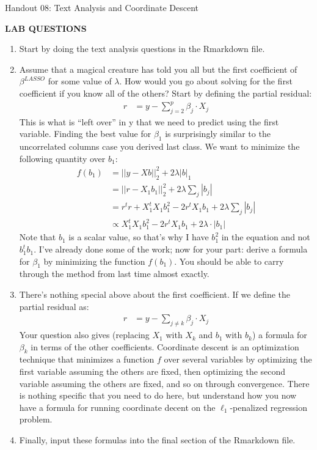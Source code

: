 \documentclass[12pt,hidelinks]{article}
\numberwithin{equation}{section}
\begin{document}
{\LARGE Handout 08: Text Analysis and Coordinate Descent}

\textbf{LAB QUESTIONS}

\vspace*{0pt}

\begin{enumerate}
\item Start by doing the text analysis questions in the Rmarkdown file.
\item Assume that a magical creature has told you all but the first
coefficient of $\beta^{LASSO}$ for some value of $\lambda$. How would you
go about solving for the first coefficient if you know all of the others?
Start by defining the partial residual:
\begin{align}
r &= y - \sum_{j = 2}^p \beta_j \cdot X_j
\end{align}
This is what is ``left over'' in y that we need to predict using the first
variable. Finding the best value for $\beta_1$ is surprisingly similar to the
uncorrelated columns case you derived last class. We want to minimize the
following quantity over $b_1$:
\begin{align}
f(b_1) &= || y - X b ||_2^2 + 2 \lambda | b |_1 \\
&= || r - X_1 b_1 ||_2^2 + 2 \lambda \sum_j | b_j | \\
&= r^t r + X_1^t X_1 b_1^2 - 2 r^t X_1 b_1 + 2 \lambda \sum_j | b_j | \\
&\propto X_1^t X_1 b_1^2 - 2 r^t X_1 b_1 + 2 \lambda \cdot | b_1 |
\end{align}
Note that $b_1$ is a scalar value, so that's why I have $b_1^2$ in the equation
and not $b_1^t b_1$. I've already done some of the work; now for your part:
derive a formula for $\beta_1$ by minimizing the function $f(b_1)$. You should
be able to carry through the method from last time almost exactly.

\item There's nothing special above about the first coefficient. If we define
the partial residual as:
\begin{align}
r &= y - \sum_{j \neq k} \beta_j \cdot X_j
\end{align}
Your question also gives (replacing $X_1$ with $X_k$ and $b_1$ with $b_k$) a
formula for $\beta_k$ in terms of the other coefficients. Coordinate descent
is an optimization technique that minimizes a function $f$ over several variables
by optimizing the first variable assuming the others are fixed, then optimizing
the second variable assuming the others are fixed, and so on through convergence.
There is nothing specific that you need to do here, but understand how you now
have a formula for running coordinate decent on the $\ell_1$-penalized regression
problem.

\item Finally, input these formulas into the final section of the Rmarkdown
file.
\end{enumerate}
\end{document}
